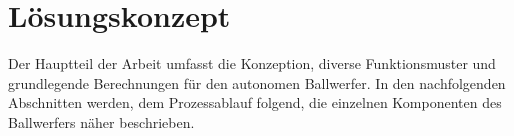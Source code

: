 \section{Lösungskonzept}
Der Hauptteil der Arbeit umfasst die Konzeption, diverse Funktionsmuster und 
grundlegende Berechnungen für den autonomen Ballwerfer. 
In den nachfolgenden Abschnitten werden, dem Prozessablauf folgend, die einzelnen 
Komponenten des Ballwerfers näher beschrieben. 